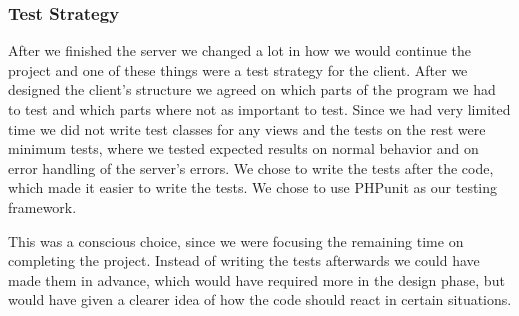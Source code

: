 \subsubsection{Test Strategy}
After we finished the server we changed a lot in how we would continue the project and one of these things were a test strategy for the client. After we designed the client's structure we agreed on which parts of the program we had to test and which parts where not as important to test. Since we had very limited time we did not write test classes for any views and the tests on the rest were minimum tests, where we tested expected results on normal behavior and on error handling of the server's errors. We chose to write the tests after the code, which made it easier to write the tests. We chose to use PHPunit as our testing framework.

This was a conscious choice, since we were focusing the remaining time on completing the project. Instead of writing the tests afterwards we could have made them in advance, which would have required more in the design phase, but would have given a clearer idea of how the code should react in certain situations.